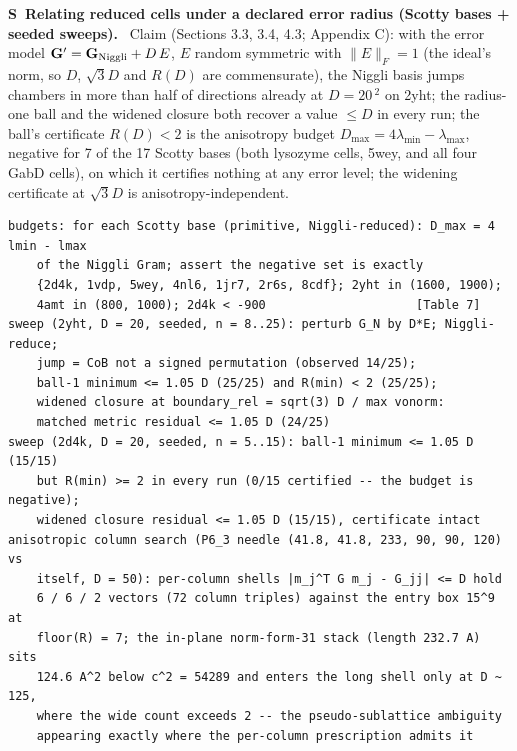 \documentclass[11pt]{article}
\newcommand{\Ang}{\text{\AA}}
\newcommand{\Gmet}{\mathbf{G}}
\newcounter{scheck}
\renewcommand{\thescheck}{S\arabic{scheck}}
\newcommand{\sitem}[2]{\medskip\noindent\refstepcounter{scheck}\label{#1}\textbf{\thescheck\ #2.}\ }
\begin{document}
\sitem{z:declared-error}{Relating reduced cells under a declared error radius (Scotty bases + seeded sweeps)}
Claim (Sections 3.3, 3.4, 4.3; Appendix C): with the error model $\Gmet'=\Gmet_{\rm Niggli}+D\,E$, $E$ random symmetric with $\|E\|_F=1$ (the ideal's norm, so $D$, $\sqrt3 D$ and $R(D)$ are commensurate), the Niggli basis jumps chambers in more than half of directions already at $D=20$\,\Ang$^2$ on 2yht; the radius-one ball and the widened closure both recover a value $\le D$ in every run; the ball's certificate $R(D)<2$ is the anisotropy budget $D_{\max}=4\lambda_{\min}-\lambda_{\max}$, negative for 7 of the 17 Scotty bases (both lysozyme cells, 5wey, and all four GabD cells), on which it certifies nothing at any error level; the widening certificate at $\sqrt3 D$ is anisotropy-independent.
\begin{footnotesize}\begin{verbatim}
budgets: for each Scotty base (primitive, Niggli-reduced): D_max = 4 lmin - lmax
    of the Niggli Gram; assert the negative set is exactly
    {2d4k, 1vdp, 5wey, 4nl6, 1jr7, 2r6s, 8cdf}; 2yht in (1600, 1900);
    4amt in (800, 1000); 2d4k < -900                     [Table 7]
sweep (2yht, D = 20, seeded, n = 8..25): perturb G_N by D*E; Niggli-reduce;
    jump = CoB not a signed permutation (observed 14/25);
    ball-1 minimum <= 1.05 D (25/25) and R(min) < 2 (25/25);
    widened closure at boundary_rel = sqrt(3) D / max vonorm:
    matched metric residual <= 1.05 D (24/25)
sweep (2d4k, D = 20, seeded, n = 5..15): ball-1 minimum <= 1.05 D (15/15)
    but R(min) >= 2 in every run (0/15 certified -- the budget is negative);
    widened closure residual <= 1.05 D (15/15), certificate intact
anisotropic column search (P6_3 needle (41.8, 41.8, 233, 90, 90, 120) vs
    itself, D = 50): per-column shells |m_j^T G m_j - G_jj| <= D hold
    6 / 6 / 2 vectors (72 column triples) against the entry box 15^9 at
    floor(R) = 7; the in-plane norm-form-31 stack (length 232.7 A) sits
    124.6 A^2 below c^2 = 54289 and enters the long shell only at D ~ 125,
    where the wide count exceeds 2 -- the pseudo-sublattice ambiguity
    appearing exactly where the per-column prescription admits it
\end{verbatim}\end{footnotesize}
\end{document}
